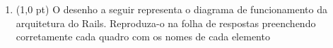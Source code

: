 \documentclass[a4paper,10pt]{article}
\begin{document}
\begin{multicols*}{2}
\begin{enumerate}
    \textbf{LISTA 2}
    \begin{enumerate}[label=(\enumalphalphcnt*),start=27,itemsep=0em]
      \item rb
      \item \textit{Framework}
      \item app
      \item MVC
      \item Modelo
      \item ls
      \item Bash
      \item Ambiente de desenvolvimento
      \item Visualização
      \item mkdir
      \item server
      \item cd
      \item add
      \item rm
      \item Rails
      \item log
      \item cp
      \item Git
      \item Gemfile
      \item Roteador
      \item config
      \item Bundler
      \item init
      \item new
      \item commit
      \item GitHub
      \item \textit{Deployment}
    \end{enumerate}

  \item (1,0 pt) O desenho a seguir representa o diagrama de funcionamento da arquitetura do Rails. Reproduza-o na folha de respostas preenchendo corretamente cada quadro com os nomes de cada elemento


\end{enumerate}
\end{multicols*}
\end{document}
